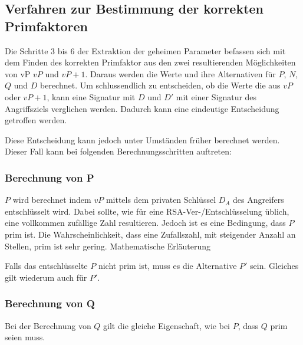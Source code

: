         \subsection{Verfahren zur Bestimmung der korrekten Primfaktoren}

            Die Schritte 3 bis 6 der Extraktion der geheimen Parameter befassen sich mit dem Finden des korrekten Primfaktor aus den zwei resultierenden Möglichkeiten von vP $vP$ und $vP+1$. Daraus werden die Werte und ihre Alternativen für $P$, $N$, $Q$ und $D$ berechnet. 
            Um schlussendlich zu entscheiden, ob die Werte die aus $vP$ oder $vP+1$, kann eine Signatur mit $D$ und $D'$ mit einer Signatur des Angriffsziels verglichen werden. Dadurch kann eine eindeutige Entscheidung getroffen werden. 

            Diese Entscheidung kann jedoch unter Umständen früher berechnet werden. Dieser Fall kann bei folgenden Berechnungsschritten  auftreten:

            \subsubsection{Berechnung von P}
                $P$ wird berechnet indem $vP$ mittels dem privaten Schlüssel $D_{A}$ des Angreifers entschlüsselt wird. Dabei sollte, wie für eine \ac{RSA}-Ver-/Entschlüsselung üblich, eine vollkommen zufällige Zahl resultieren. Jedoch ist es eine Bedingung, dass $P$ prim ist. 
                Die Wahrscheinlichkeit, dass eine Zufallszahl, mit steigender Anzahl an Stellen, prim ist sehr gering. 
                Mathematische Erläuterung %

                Falls das entschlüsselte $P$ nicht prim ist, muss es die Alternative $P'$ sein. Gleiches gilt wiederum auch für $P'$.

            \subsubsection{Berechnung von Q} \label{sec-kep-optQ}
                Bei der Berechnung von $Q$ gilt die gleiche Eigenschaft, wie bei $P$, dass $Q$ prim seien muss.

